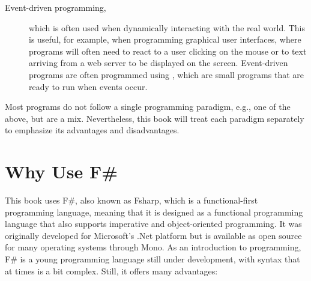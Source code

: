 \documentclass[fsharpNotes.tex]{subfiles}
\begin{document}
\begin{description}
\item[Event-driven programming,] which is often used when dynamically interacting with the real world. This is useful, for example, when programming graphical user interfaces, where programs will often need to react to a user clicking on the mouse or to text arriving from a web server to be displayed on the screen. Event-driven programs are often programmed using , which are small programs that are ready to run when events occur.
\end{description}
Most programs do not follow a single programming paradigm, e.g., one of the above, but are a mix. Nevertheless, this book will treat each paradigm separately to emphasize its advantages and disadvantages.

\section{Why Use F\#}
This book uses F\#, also known as Fsharp, which is a functional-first programming language, meaning that it is designed as a functional programming language that also supports imperative and object-oriented programming. It was originally developed for Microsoft's .Net platform but is available as open source for many operating systems through Mono. As an introduction to programming, F\# is a young programming language still under development, with syntax that at times is a bit complex. Still, it offers many advantages:
\end{document}
